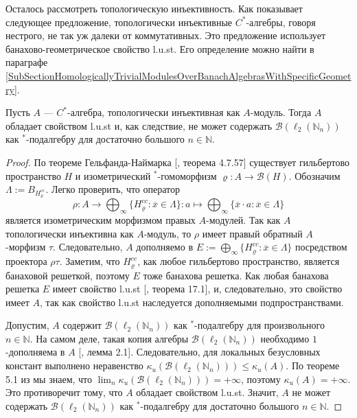 Осталось рассмотреть топологическую инъективность. Как показывает следующее предложение, топологически инъективные $C^*$-алгебры, говоря нестрого, не так уж далеки от коммутативных. Это предложение использует банахово-геометрическое свойство l.u.st. Его определение можно найти в параграфе \ref{SubSectionHomologicallyTrivialModulesOverBanachAlgebrasWithSpecificGeometry}.

\begin{proposition}\label{TopInjIdHaveLUST} Пусть $A$ --- $C^*$-алгебра, топологически инъективная как $A$-модуль. Тогда $A$ обладает свойством l.u.st и, как следствие, не может содержать $\mathcal{B}(\ell_2(\mathbb{N}_n))$ как ${}^*$-подалгебру для достаточно большого $n\in\mathbb{N}$.
\end{proposition}
\begin{proof} По теореме Гельфанда-Наймарка [\cite{HelBanLocConvAlg}, теорема 4.7.57] существует гильбертово пространство $H$ и изометрический ${}^*$-гомоморфизм $\varrho:A\to\mathcal{B}(H)$. Обозначим $\Lambda:=B_{H_\varrho^{cc}}$. Легко проверить, что оператор 
$$
\rho:A\to\bigoplus\nolimits_\infty\{H_\varrho^{cc}:\overline{x}\in \Lambda\}:a\mapsto \bigoplus\nolimits_\infty\{\overline{x}\cdot a:\overline{x}\in \Lambda\}
$$
является изометрическим морфизмом правых $A$-модулей. Так как $A$ топологически инъективна как $A$-модуль, то $\rho$ имеет правый обратный $A$-морфизм $\tau$. Следовательно, $A$ дополняемо в $E:=\bigoplus_\infty\{H_\varrho^{cc}:\overline{x}\in \Lambda\}$ посредством проектора $\rho\tau$. Заметим, что $H_{\varrho}^{cc}$, как любое гильбертово пространство, является банаховой решеткой, поэтому $E$ тоже банахова решетка. Как любая банахова решетка $E$ имеет свойство l.u.st [\cite{DiestAbsSumOps}, теорема 17.1], и, следовательно, это свойство имеет $A$, так как свойство l.u.st наследуется дополняемыми подпространствами.

Допустим, $A$ содержит $\mathcal{B}(\ell_2(\mathbb{N}_n))$ как ${}^*$-подалгебру для произвольного $n\in\mathbb{N}$. На самом деле, такая копия алгебры $\mathcal{B}(\ell_2(\mathbb{N}_n))$ необходимо $1$-дополняема в $A$ [\cite{LauLoyWillisAmnblOfBanAndCStarAlgsOfLCG}, лемма 2.1]. Следовательно, для локальных безусловных констант выполнено неравенство $\kappa_u(\mathcal{B}(\ell_2(\mathbb{N}_n)))\leq \kappa_u(A)$. По теореме 5.1 из \cite{GorLewAbsSmOpAndLocUncondStrct} мы знаем, что $\lim_n \kappa_u(\mathcal{B}(\ell_2(\mathbb{N}_n)))=+\infty$, поэтому $\kappa_u(A)=+\infty$. Это противоречит тому, что $A$ обладает свойством l.u.st. Значит, $A$ не может содержать $\mathcal{B}(\ell_2(\mathbb{N}_n))$ как ${}^*$-подалгебру для достаточно большого $n\in\mathbb{N}$.
\end{proof}

